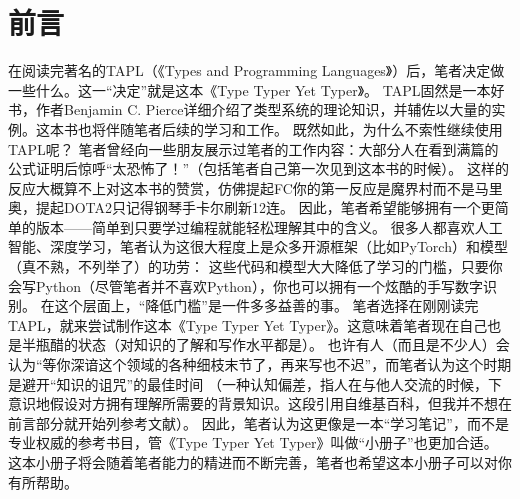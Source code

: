 \documentclass[../main.tex]{subfiles}
\begin{document}
  \section*{前言}
  \indent 在阅读完著名的TAPL（《Types and Programming Languages》）后，笔者决定做一些什么。这一“决定”就是这本《Type Typer Yet Typer》。
  \newline
  \indent TAPL固然是一本好书，作者Benjamin C. Pierce详细介绍了类型系统的理论知识，并辅佐以大量的实例。这本书也将伴随笔者后续的学习和工作。
  既然如此，为什么不索性继续使用TAPL呢？
  笔者曾经向一些朋友展示过笔者的工作内容：大部分人在看到满篇的公式证明后惊呼“太恐怖了！”（包括笔者自己第一次见到这本书的时候）。
  这样的反应大概算不上对这本书的赞赏，仿佛提起FC你的第一反应是魔界村而不是马里奥，提起DOTA2只记得钢琴手卡尔刷新12连。
  \newline
  \indent 因此，笔者希望能够拥有一个更简单的版本——简单到只要学过编程就能轻松理解其中的含义。
  很多人都喜欢人工智能、深度学习，笔者认为这很大程度上是众多开源框架（比如PyTorch）和模型（真不熟，不列举了）的功劳：
  这些代码和模型大大降低了学习的门槛，只要你会写Python（尽管笔者并不喜欢Python），你也可以拥有一个炫酷的手写数字识别。
  在这个层面上，“降低门槛”是一件多多益善的事。
  \newline
  \indent 笔者选择在刚刚读完TAPL，就来尝试制作这本《Type Typer Yet Typer》。这意味着笔者现在自己也是半瓶醋的状态（对知识的了解和写作水平都是）。
  也许有人（而且是不少人）会认为“等你深谙这个领域的各种细枝末节了，再来写也不迟”，而笔者认为这个时期是避开“知识的诅咒”的最佳时间
  （一种认知偏差，指人在与他人交流的时候，下意识地假设对方拥有理解所需要的背景知识。这段引用自维基百科，但我并不想在前言部分就开始列参考文献）。
  因此，笔者认为这更像是一本“学习笔记”，而不是专业权威的参考书目，管《Type Typer Yet Typer》叫做“小册子”也更加合适。
  这本小册子将会随着笔者能力的精进而不断完善，笔者也希望这本小册子可以对你有所帮助。
\end{document}
